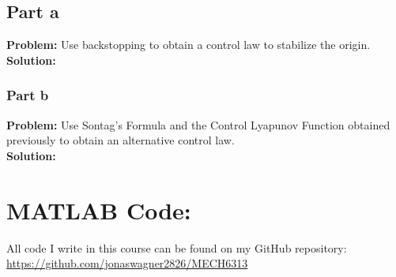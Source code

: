 \documentclass[letter]{article}
\begin{document}
\subsection{Part a}
\textbf{Problem:}
Use backstopping to obtain a control law to stabilize the origin.\\

\noindent
\textbf{Solution:}



\subsubsection{Part b}
\textbf{Problem:}
Use Sontag's Formula and the Control Lyapunov Function obtained previously to obtain an alternative control law.\\

\noindent
\textbf{Solution:}





\newpage
\appendix
\section{MATLAB Code:}\label{apx:matlab}
All code I write in this course can be found on my GitHub repository:\\
\href{https://github.com/jonaswagner2826/MECH6313}{https://github.com/jonaswagner2826/MECH6313}
%
\end{document}
